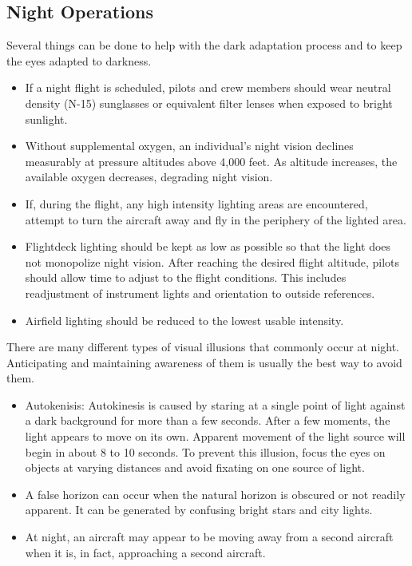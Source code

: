\documentclass[12pt]{article}
\begin{document}
	\subsection{Night Operations}
		Several things can be done to help with the dark adaptation process and to keep the eyes adapted to darkness. 
			\begin{itemize}
				\item If a night flight is scheduled, pilots and crew members should wear neutral density (N-15) sunglasses or equivalent filter lenses when exposed to bright sunlight. 
				\item  Without supplemental oxygen, an individual’s night vision declines measurably at pressure altitudes above 4,000 feet. As altitude increases, the available oxygen decreases, degrading night vision.
				\item If, during the flight, any high intensity lighting areas are encountered, attempt to turn the aircraft away and fly in the periphery of the lighted area.
				\item Flightdeck lighting should be kept as low as possible so that the light does not monopolize night vision. After reaching the desired flight altitude, pilots should allow time to adjust to the flight conditions. This includes readjustment of instrument lights and orientation to outside references.
				\item Airfield lighting should be reduced to the lowest usable intensity.
			\end{itemize}
		There are many different types of visual illusions that commonly occur at night. Anticipating and maintaining awareness of them is usually the best way to avoid them.
		\begin{itemize}
			\item Autokenisis: Autokinesis is caused by staring at a single point of light against a dark background for more than a few seconds. After a few moments, the light appears to move on its own. Apparent movement of the light source will begin in about 8 to 10 seconds. To prevent this illusion, focus the eyes on objects at varying distances and avoid fixating on one source of light. 
			\item A false horizon can occur when the natural horizon is obscured or not readily apparent. It can be generated by confusing bright stars and city lights.
			\item At night, an aircraft may appear to be moving away from a second aircraft when it is, in fact, approaching a second aircraft.
		\end{itemize}
\end{document}
